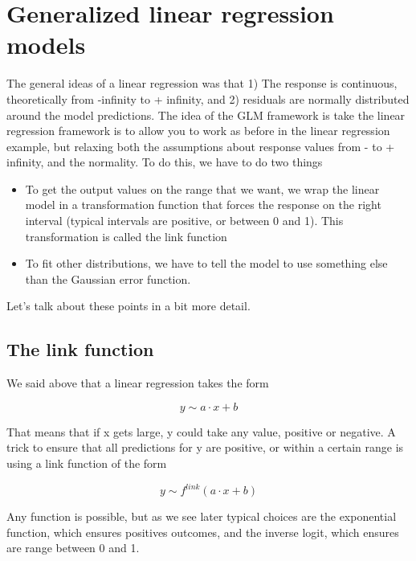 \documentclass[a4paper,twoside]{tufte-book}\usepackage[]{graphicx}\usepackage[]{color}
\begin{document}
{\section{Generalized linear regression models}

The general ideas of a linear regression was that 1) The response is continuous, theoretically from -infinity to + infinity, and 2) residuals are normally distributed around the model predictions. The idea of the GLM framework is take the linear regression framework is to allow you to work as before in the linear regression example, but relaxing both the assumptions about response values from - to + infinity, and the normality. To do this, we have to do two things

\begin{itemize}
  \item To get the output values on the range that we want, we wrap the linear model in a transformation function that forces the response on the right interval (typical intervals are positive, or between 0 and 1). This transformation is called the link function
  \item To fit other distributions, we have to tell the model to use something else than the Gaussian error function. 
\end{itemize}    
   
Let's talk about these points in a bit more detail.

\subsection{The link function}

We said above that a linear regression takes the form 

\begin{equation}
y \sim a \cdot x + b 
\end{equation}

That means that if x gets large, y could take any value, positive or negative. A trick to ensure that all predictions for y are positive, or within a certain range is using a link function of the form 

\begin{equation}
y \sim f^{link}(a \cdot x + b )
\end{equation}

Any function is possible, but as we see later typical choices are the exponential function, which ensures positives outcomes, and the inverse logit, which ensures are range between 0 and 1.

}
\end{document}
